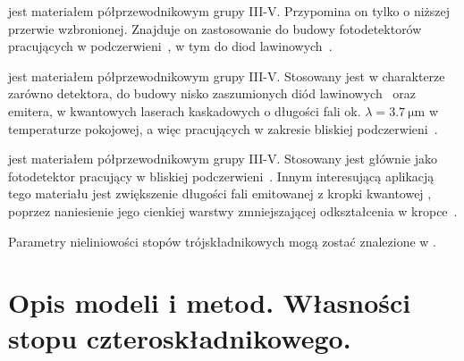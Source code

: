 \documentclass[12pt,openany,a4paper]{book}
\begin{document}
 jest materiałem półprzewodnikowym grupy III-V. Przypomina on  tylko o niższej
przerwie wzbronionej. Znajduje on zastosowanie do budowy fotodetektorów pracujących w podczerwieni~\autocite{Law1981}, w tym do diod lawinowych~\autocite{Hildebrand1980,Hildebrand1981}.


 jest materiałem półprzewodnikowym grupy III-V. Stosowany jest w charakterze zarówno detektora, do budowy
nisko zaszumionych diód lawinowych~\autocite{Tan2012} oraz emitera, w kwantowych laserach kaskadowych o długości fali ok. \(\lambda = \SI{3.7}{\micro\metre}\)
w temperaturze pokojowej, a więc pracujących w zakresie bliskiej podczerwieni~\autocite{Yang2006}.

 jest materiałem półprzewodnikowym grupy III-V. Stosowany jest głównie jako
fotodetektor pracujący w bliskiej podczerwieni~\autocite{Sun2002,Li2015}. Innym interesującą aplikacją
tego materiału jest zwiększenie długości fali emitowanej z kropki kwantowej , poprzez
naniesienie jego cienkiej warstwy zmniejszającej odkształcenia w kropce~\autocite{Liu2005}.



Parametry nieliniowości stopów trójskładnikowych mogą zostać znalezione w \textcite{Vurgaftman2001,Linnik2000,Adachi1989,Adachi2017,Mozume2008}.



	

\chapter{Opis modeli i metod. Własności stopu czteroskładnikowego.}\label{chapt:methods}
\end{document}
